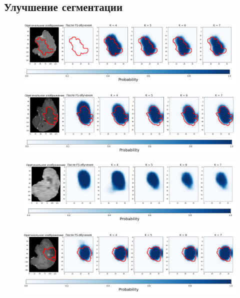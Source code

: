 \newpage
\subsection{Улучшение сегментации}

\begin{figure}[h!] 
  \center
  \includegraphics [scale=0.7] {images/good_1.png}
\end{figure}


\begin{figure}[h!] 
  \center
  \includegraphics [scale=0.7] {images/good_2.png}
\end{figure}

\begin{figure}[h!] 
  \center
  \includegraphics [scale=0.7] {images/good_3.png}
\end{figure}

\begin{figure}[h!] 
  \center
  \includegraphics [scale=0.7] {images/good_4.png}
\end{figure}



